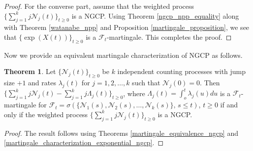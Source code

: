 \documentclass[11pt,oneside,reqno]{amsart}
\theoremstyle{definition}
\newtheorem{theorem}{\bf Theorem}[section]
\theoremstyle{remarkstyle}
\begin{document}
\begin{proof}
     
    For the converse part, assume that the weighted process $\{\sum_{j=1}^{k}j\mathcal{N}_j(t)\}_{t\ge 0}$ is a NGCP. Using Theorem \ref{ngcp_npp_equality} along with Theorem \ref{watanabe_npp} and Proposition \ref{martingale_proposition}, we see that $\{\exp\left(X(t)\right)\}_{t\ge 0}$ is a $\mathcal{F}_t$-martingale. This completes the proof.
\end{proof}
Now we provide an equivalent martingale characterization of NGCP as follows.
\begin{theorem}\label{martingale_characterization_compensated_ngcp}
    Let $\{\mathcal{N}_j(t)\}_{t\ge 0}$ be $k$ independent counting processes with jump size $+1$ and rates $\lambda_j(t)$ for $j=1,2,\dots,k$ such that $\mathcal{N}_j(0)=0$. Then $\{\sum_{j=1}^{k}j\mathcal{N}_j(t)-\sum_{j=1}^{k}j\Lambda_j(t)\}_{t\ge 0}$, where $\Lambda_j(t)=\int_{o}^{t}\lambda_j(u)du$ is a $\mathcal{F}_t$-martingale for $\mathcal{F}_t=\sigma(\{\mathcal{N}_1(s),\mathcal{N}_2(s),\dots,\mathcal{N}_k(s)\},\,s\le t)$, $t\ge 0$ if and only if the weighted process $\{\sum_{j=1}^{k}j\mathcal{N}_j(t)\}_{t\ge 0}$ is a NGCP.
\end{theorem}

\begin{proof}
The result follows using Theorems \ref{martingale_equivalence_ngcp} and \ref{martingale_characterization_exponential_ngcp}.     
\end{proof}
\end{document}
